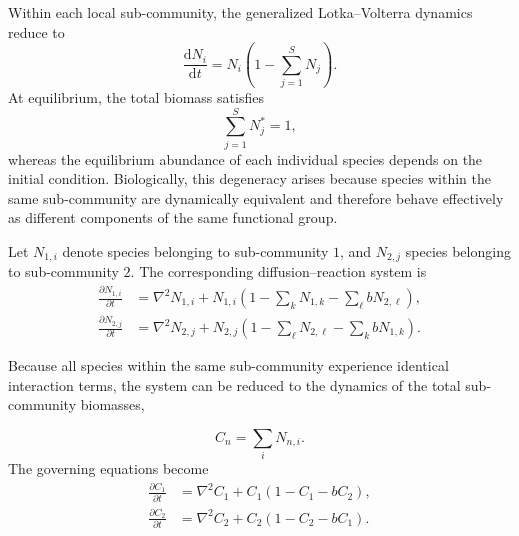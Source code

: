 Within each local sub-community, the generalized Lotka--Volterra dynamics reduce to
\begin{equation}
    \frac{\mathrm{d}N_i}{\mathrm{d}t}
    =
    N_i
    \left(
        1-\sum_{j=1}^{S}N_j
    \right).
\end{equation}
At equilibrium, the total biomass satisfies
\begin{equation*}
    \sum_{j=1}^{S}N_j^*=1,
\end{equation*}
whereas the equilibrium abundance of each individual species depends on the initial condition. Biologically, this degeneracy arises because species within the same sub-community are dynamically equivalent and therefore behave effectively as different components of the same functional group.

Let $N_{1,i}$ denote species belonging to sub-community $1$, and $N_{2,j}$ species belonging to sub-community $2$. The corresponding diffusion--reaction system is
\begin{equation*}
    \begin{aligned}
        \frac{\partial N_{1,i}}{\partial t}
        &=
        \nabla^2 N_{1,i}
        +
        N_{1,i}
        \left(
            1
            -
            \sum_{k}N_{1,k}
            -
            \sum_{\ell}bN_{2,\ell}
        \right),\\
        \frac{\partial N_{2,j}}{\partial t}
        &=
        \nabla^2 N_{2,j}
        +
        N_{2,j}
        \left(
            1
            -
            \sum_{\ell}N_{2,\ell}
            -
            \sum_{k}bN_{1,k}
        \right).
    \end{aligned}
\end{equation*}

Because all species within the same sub-community experience identical interaction terms, the system can be reduced to the dynamics of the total sub-community biomasses,

\begin{equation*}
    C_n=\sum_i N_{n,i}.
\end{equation*}
The governing equations become
\begin{equation*}
    \begin{aligned}
        \frac{\partial C_1}{\partial t}
        &=
        \nabla^2 C_1
        +
        C_1
        \left(
            1
            -
            C_1
            -
            bC_2
        \right),\\
        \frac{\partial C_2}{\partial t}
        &=
        \nabla^2 C_2
        +
        C_2
        \left(
            1
            -
            C_2
            -
            bC_1
        \right).
    \end{aligned}
\end{equation*}

